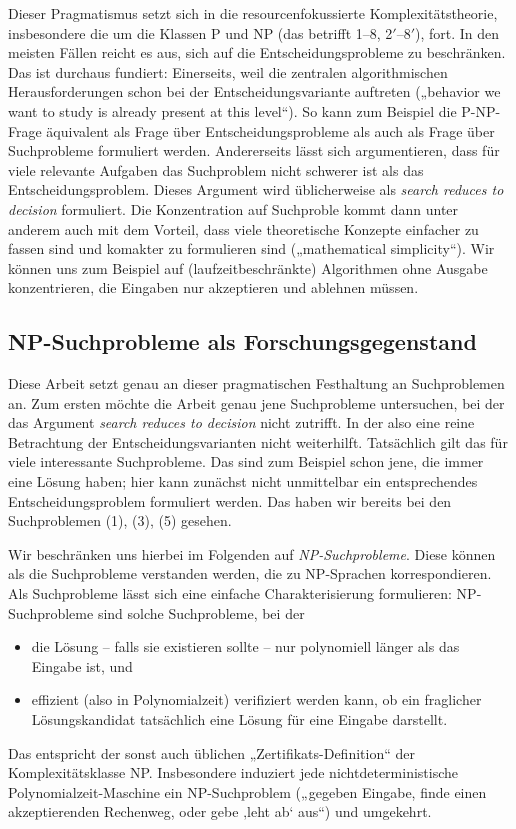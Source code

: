 Dieser Pragmatismus setzt sich in die resourcenfokussierte Komplexitätstheorie, insbesondere die um die Klassen P und NP (das betrifft 1--8, 2$'$--8$'$), fort.
In den meisten Fällen reicht es aus, sich auf die Entscheidungsprobleme zu beschränken.
Das ist durchaus fundiert:
Einerseits, weil die zentralen algorithmischen Herausforderungen schon bei der Entscheidungsvariante auftreten („behavior we want to study is already present at this level“). So kann zum Beispiel die P-NP-Frage äquivalent als Frage über Entscheidungsprobleme als auch als Frage über Suchprobleme formuliert werden. Andererseits lässt sich argumentieren, dass für viele relevante Aufgaben das Suchproblem nicht schwerer ist als das Entscheidungsproblem. Dieses Argument wird üblicherweise als \emph{search reduces to decision} formuliert. Die Konzentration auf Suchproble kommt dann unter anderem auch mit dem Vorteil, dass viele theoretische Konzepte einfacher zu fassen sind und komakter zu formulieren sind („mathematical simplicity“). Wir können uns zum Beispiel auf (laufzeitbeschränkte) Algorithmen ohne Ausgabe konzentrieren, die Eingaben nur akzeptieren und ablehnen müssen. 

\subsection*{NP-Suchprobleme als Forschungsgegenstand}

Diese Arbeit setzt genau an dieser pragmatischen Festhaltung an Suchproblemen an.
Zum ersten möchte die Arbeit genau jene Suchprobleme untersuchen, bei der das Argument \emph{search reduces to decision} nicht zutrifft. In der also eine reine Betrachtung der Entscheidungsvarianten nicht weiterhilft. Tatsächlich gilt das für viele interessante Suchprobleme. Das sind zum Beispiel schon jene, die immer eine Lösung haben; hier kann zunächst nicht unmittelbar ein entsprechendes Entscheidungsproblem formuliert werden.
Das haben wir bereits bei den Suchproblemen (1), (3), (5) gesehen.

Wir beschränken uns hierbei im Folgenden auf \emph{NP-Suchprobleme}. Diese können als die Suchprobleme verstanden werden, die zu NP-Sprachen korrespondieren. Als Suchprobleme lässt sich eine einfache Charakterisierung formulieren: NP-Suchprobleme sind solche Suchprobleme, bei der 
\begin{itemize}[noitemsep]
    \item die Lösung -- falls sie existieren sollte -- nur polynomiell länger als das Eingabe ist, und 
    \item effizient (also in Polynomialzeit) verifiziert werden kann, ob ein fraglicher Lösungskandidat tatsächlich eine Lösung für eine Eingabe darstellt.
\end{itemize}
Das entspricht der sonst auch üblichen „Zertifikats-Definition“ der Komplexitätsklasse NP. Insbesondere induziert jede nichtdeterministische Polynomialzeit-Maschine ein NP-Suchproblem („gegeben Eingabe, finde einen akzeptierenden Rechenweg, oder gebe ‚leht ab‘ aus“) und umgekehrt.

